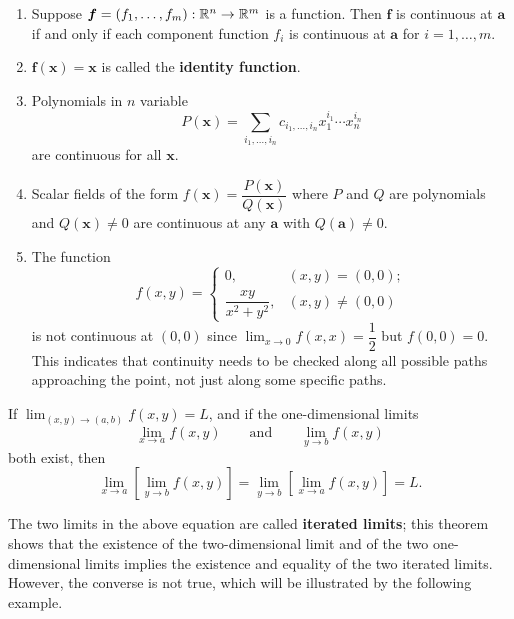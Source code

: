    \begin{exampleenv}
        \begin{enumerate}
            \item Suppose $\bm f=(f_1, \ldots, f_m):\mathbb{R}^n \to \mathbb{R}^m$ is a function. Then $\bm f$ is continuous at $\bm a$ if and only if each component function $f_i$ is continuous at $\bm a$ for $i=1, \ldots, m$.
            \item $\bm f(\bm x) = \bm x$ is called the \textbf{identity function}.
            \item Polynomials in $n$ variable
            $$ P(\bm x) = \sum_{i_1, \ldots, i_n} c_{i_1, \ldots, i_n} x_1^{i_1} \cdots x_n^{i_n} $$
            are continuous for all $\bm x$.
            \item Scalar fields of the form $f(\bm x) = \dfrac{P(\bm x)}{Q(\bm x)}$ where $P$ and $Q$ are polynomials and $Q(\bm x) \ne 0$ are continuous at any $\bm a$ with $Q(\bm a) \ne 0$.
            \item The function
            $$ f(x,y) = \begin{cases}
                0, & (x,y) = (0,0); \\[6pt]
                \dfrac{xy}{x^2 + y^2}, & (x,y) \ne (0,0)
            \end{cases}
            $$
            is not continuous at $(0,0)$ since $\displaystyle \lim_{x\to 0} f(x,x) = \dfrac{1}{2}$ but $f(0,0) = 0$. This indicates that continuity needs to be checked along all possible paths approaching the point, not just along some specific paths.
        \end{enumerate}
    \end{exampleenv}
    \begin{theoremenv}
        If \(\displaystyle \lim_{(x,y)\to(a,b)} f(x,y)=L\), and if the one-dimensional limits
        \[
        \lim_{x\to a} f(x,y) \qquad \text{and} \qquad \lim_{y\to b} f(x,y)
        \]
        both exist, then
        \[
        \lim_{x\to a}\left[\lim_{y\to b} f(x,y)\right]
        =
        \lim_{y\to b}\left[\lim_{x\to a} f(x,y)\right]
        =
        L.
        \]
    \end{theoremenv}
    \begin{remarkenv}
        The two limits in the above equation are called \textbf{iterated limits}; this theorem shows that the existence of the two-dimensional limit and of the two one-dimensional limits implies the existence and equality of the two iterated limits. However, the converse is not true, which will be illustrated by the following example.
    \end{remarkenv}
